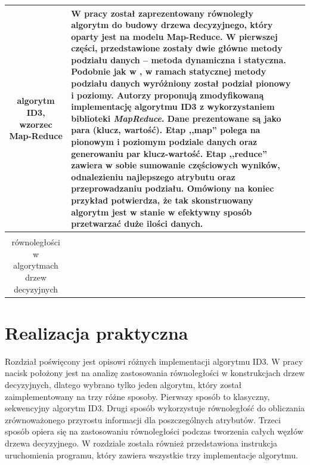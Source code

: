 \documentclass[12pt]{article}
\begin{document}
\begin{center}
\begin{longtable}{| c | p{} | p{} |}
            algorytm ID3, wzorzec Map-Reduce &

            W pracy został zaprezentowany równoległy algorytm do budowy drzewa decyzyjnego, 
            który oparty jest na modelu Map-Reduce. W pierwszej części, przedstawione zostały dwie główne metody podziału
            danych -- metoda dynamiczna i statyczna. Podobnie jak w \cite{parallel-implementation-decision-tree}, w ramach
            statycznej metody podziału danych wyróżniony został podział pionowy i poziomy. 
            Autorzy proponują zmodyfikowaną implementację algorytmu ID3 z wykorzystaniem biblioteki \textit{MapReduce}.
            Dane prezentowane są jako para (klucz, wartość). Etap ,,map'' polega na pionowym i poziomym podziale danych oraz generowaniu par klucz-wartość.
            Etap ,,reduce'' zawiera w sobie sumowanie częściowych wyników, odnalezieniu najlepszego atrybutu oraz
            przeprowadzaniu podziału. Omówiony na koniec przykład potwierdza, że tak skonstruowany algorytm jest w stanie
            w efektywny sposób przetwarzać duże ilości danych.\\

            \hline

        \caption{Zestawienie artykułów poruszających tematykę\\ równoległości w algorytmach drzew decyzyjnych}
        \label{table:articles-parallel-decision-tree}
 
        \end{longtable}

    \end{center}
\newpage

\section{Realizacja praktyczna}

Rozdział poświęcony jest opisowi różnych implementacji algorytmu ID3. W pracy nacisk położony jest na analizę
zastosowania równoległości w konstrukcjach drzew decyzyjnych, dlatego wybrano tylko jeden algorytm, który został
zaimplementowany na trzy różne sposoby. Pierwszy sposób to klasyczny, sekwencyjny algorytm ID3. Drugi sposób
wykorzystuje równoległość do obliczania zrównoważonego przyrostu informacji dla poszczególnych atrybutów.
Trzeci sposób opiera się na zastosowaniu równoległości podczas tworzenia całych węzłów drzewa decyzyjnego.
W rozdziale została również przedstawiona instrukcja uruchomienia programu, który zawiera wszystkie trzy
implementacje algorytmu.
\end{document}
